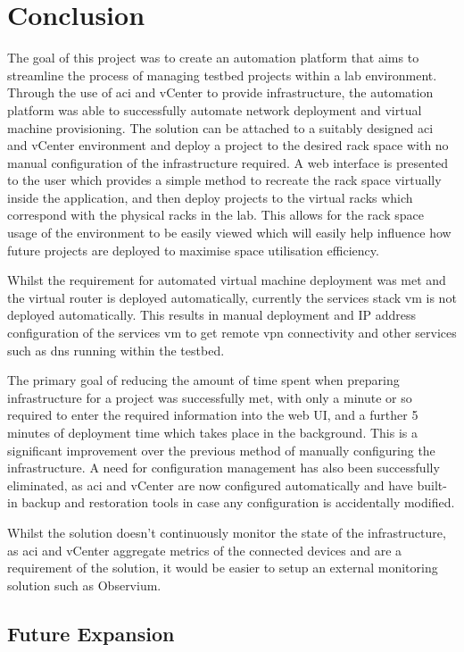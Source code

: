 \chapter{Conclusion}
\label{chap:conclusion}
The goal of this project was to create an automation platform that aims to streamline the process of managing testbed projects within a lab environment. Through the use of \gls{aci} and vCenter to provide infrastructure, the automation platform was able to successfully automate network deployment and virtual machine provisioning. The solution can be attached to a suitably designed \gls{aci} and vCenter environment and deploy a project to the desired rack space with no manual configuration of the infrastructure required. A web interface is presented to the user which provides a simple method to recreate the rack space virtually inside the application, and then deploy projects to the virtual racks which correspond with the physical racks in the lab. This allows for the rack space usage of the environment to be easily viewed which will easily help influence how future projects are deployed to maximise space utilisation efficiency.

Whilst the requirement for automated virtual machine deployment was met and the virtual router is deployed automatically, currently the services stack \gls{vm} is not deployed automatically. This results in manual deployment and IP address configuration of the services \gls{vm} to get remote \gls{vpn} connectivity and other services such as \gls{dns} running within the testbed.

The primary goal of reducing the amount of time spent when preparing infrastructure for a project was successfully met, with only a minute or so required to enter the required information into the web UI, and a further 5 minutes of deployment time which takes place in the background. This is a significant improvement over the previous method of manually configuring the infrastructure. A need for configuration management has also been successfully eliminated, as \gls{aci} and vCenter are now configured automatically and have built-in backup and restoration tools in case any configuration is accidentally modified.

Whilst the solution doesn't continuously monitor the state of the infrastructure, as \gls{aci} and vCenter aggregate metrics of the connected devices and are a requirement of the solution, it would be easier to setup an external monitoring solution such as Observium.

\section{Future Expansion}
\label{sec:future-expansion}

